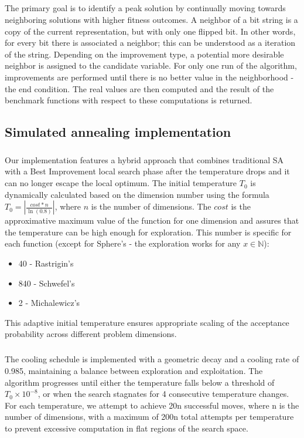 \documentclass{article}
\begin{document}
\subparagraph{}
The primary goal is to identify a peak solution by continually moving towards neighboring solutions with higher fitness outcomes. A neighbor of a bit string is a copy of the current representation, but with only one flipped bit. In other words, for every bit there is associated a neighbor; this can be understood as a iteration of the string. Depending on the improvement type, a potential more desirable neighbor is assigned to the candidate variable. For only one run of the algorithm, improvements are performed until there is no better value in the neighborhood - the end condition. The real values are then computed and the result of the benchmark functions with respect to these computations is returned.

\subsection{Simulated annealing implementation}

\subparagraph{}
Our implementation features a hybrid approach that combines traditional SA with a Best Improvement local search phase after the temperature drops and it can no longer escape the local optimum. The initial temperature $T_0$ is dynamically calculated based on the dimension number using the formula $T_0 = \left|\frac{cost*n}{\ln(0.8)}\right|$, where $n$ is the number of dimensions. The $cost$ is the approximative maximum value of the function for one dimension and assures that the temperature can be high enough for exploration. This number is specific for each function (except for Sphere's - the exploration works for any $ x \in \mathbb{N}$):
\begin{itemize} 
    \item 40 - Rastrigin's 
    \item 840 -  Schwefel's 
    \item 2 - Michalewicz's 
\end{itemize} 
This adaptive initial temperature ensures appropriate scaling of the acceptance probability across different problem dimensions. 

\subparagraph{}
The cooling schedule is implemented with a geometric decay and a cooling rate of 0.985, maintaining a balance between exploration and exploitation. The algorithm progresses until either the temperature falls below a threshold of $T_0\times10^{-8}$, or when the search stagnates for 4 consecutive temperature changes. For each temperature, we attempt to achieve 20n successful moves, where n is the number of dimensions, with a maximum of 200n total attempts per temperature to prevent excessive computation in flat regions of the search space. 
\end{document}
